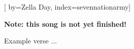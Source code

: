 

[%
    by={Zella Day},
    index={sevennationarmy}]


    \label{sevennationarmy}

    \textbf{Note: this song is not yet finished!}

    \beginverse
        Example verse ...
    \endverse
\endsong
